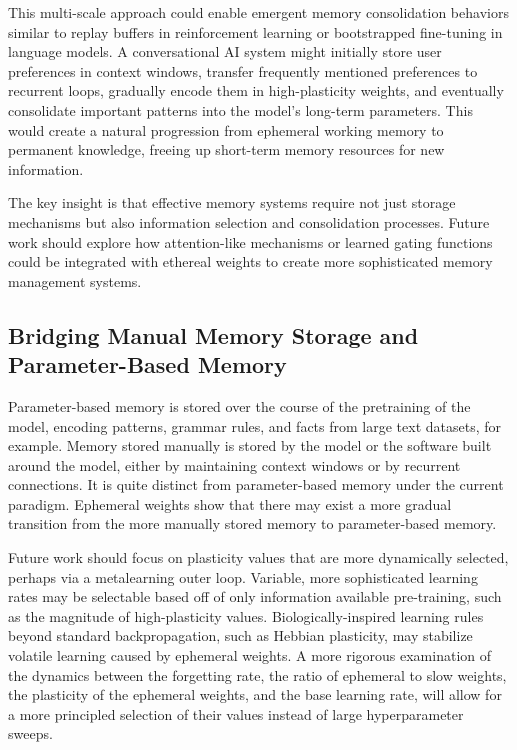 \documentclass{article} %
\begin{document}
This multi-scale approach could enable emergent memory consolidation behaviors similar to replay buffers in reinforcement learning or bootstrapped fine-tuning in language models. A conversational AI system might initially store user preferences in context windows, transfer frequently mentioned preferences to recurrent loops, gradually encode them in high-plasticity weights, and eventually consolidate important patterns into the model's long-term parameters. This would create a natural progression from ephemeral working memory to permanent knowledge, freeing up short-term memory resources for new information.

The key insight is that effective memory systems require not just storage mechanisms but also information selection and consolidation processes. Future work should explore how attention-like mechanisms or learned gating functions could be integrated with ethereal weights to create more sophisticated memory management systems.

\subsection{Bridging Manual Memory Storage and Parameter-Based Memory}

Parameter-based memory is stored over the course of the pretraining of the model, encoding patterns, grammar rules, and facts from large text datasets, for example. Memory stored manually is stored by the model or the software built around the model, either by maintaining context windows or by recurrent connections. It is quite distinct from parameter-based memory under the current paradigm. Ephemeral weights show that there may exist a more gradual transition from the more manually stored memory to parameter-based memory. 

Future work should focus on plasticity values that are more dynamically selected, perhaps via a metalearning outer loop. Variable, more sophisticated learning rates may be selectable based off of only information available pre-training, such as the magnitude of high-plasticity values. Biologically-inspired learning rules beyond standard backpropagation, such as Hebbian plasticity, may stabilize volatile learning caused by ephemeral weights. A more rigorous examination of the dynamics between the forgetting rate, the ratio of ephemeral to slow weights, the plasticity of the ephemeral weights, and the base learning rate, will allow for a more principled selection of their values instead of large hyperparameter sweeps.
\end{document}
